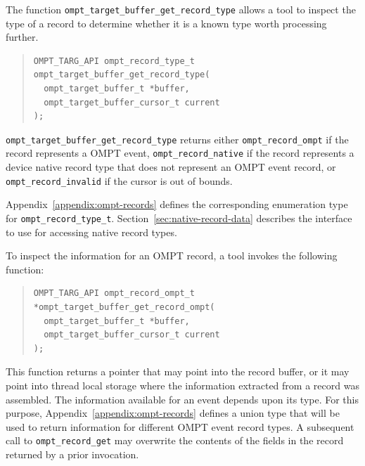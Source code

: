\documentclass{article}
\begin{document}
The function \verb|ompt_target_buffer_get_record_type| allows a tool to inspect the type of a record to determine whether it is a known type  worth processing further. 
\begin{quote}
\begin{verbatim}
OMPT_TARG_API ompt_record_type_t ompt_target_buffer_get_record_type(
  ompt_target_buffer_t *buffer, 
  ompt_target_buffer_cursor_t current
);
\end{verbatim}
\end{quote}
\sloppy
\verb|ompt_target_buffer_get_record_type| returns either \verb|ompt_record_ompt| if the record represents a OMPT event,  
\verb|ompt_record_native| if the record represents a device native record type that does not represent an OMPT event record, or \verb|ompt_record_invalid| if the cursor is out of bounds. 

Appendix~\ref{appendix:ompt-records} defines the corresponding enumeration type for \verb|ompt_record_type_t|. 
Section~\ref{sec:native-record-data} describes the interface to use for accessing native record types.
 

To inspect the information for an OMPT record, a tool invokes the following function:
\begin{quote}
\begin{verbatim}
OMPT_TARG_API ompt_record_ompt_t *ompt_target_buffer_get_record_ompt(
  ompt_target_buffer_t *buffer, 
  ompt_target_buffer_cursor_t current
);
\end{verbatim}
\end{quote}
This function returns a pointer that may point into the record buffer, or it may point into thread local storage where the information extracted from a record was assembled. The information available for an event depends upon its type. For this purpose, Appendix~\ref{appendix:ompt-records} defines a union type that will be used to return information for different OMPT event record types. A subsequent call to \verb|ompt_record_get| may overwrite the contents of the fields in the record returned by a prior invocation.
\end{document}
